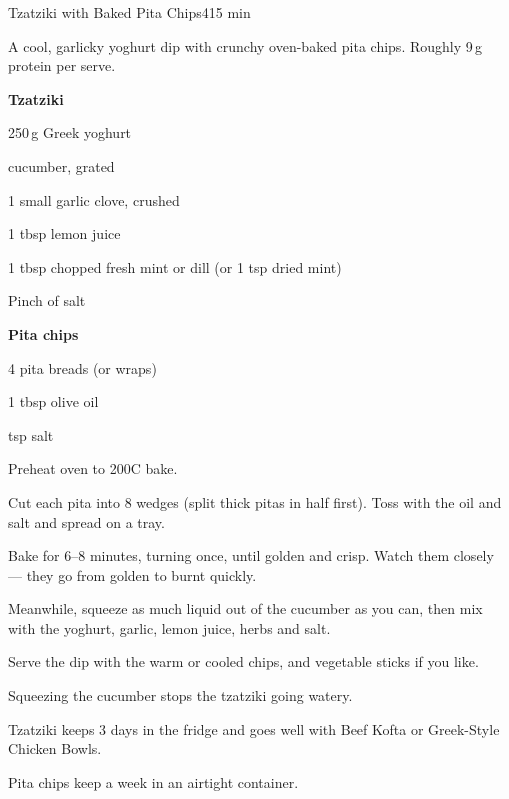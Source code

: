 \begin{recipebox}{Tzatziki with Baked Pita Chips}{4}{15 min}

A cool, garlicky yoghurt dip with crunchy oven-baked pita chips.
Roughly 9\,g protein per serve.

\begin{ingredients}
  \item[] \textbf{Tzatziki}
  \item 250\,g Greek yoghurt
  \item {} cucumber, grated
  \item 1 small garlic clove, crushed
  \item 1 tbsp lemon juice
  \item 1 tbsp chopped fresh mint or dill (or 1 tsp dried mint)
  \item Pinch of salt
  \item[] \textbf{Pita chips}
  \item 4 pita breads (or wraps)
  \item 1 tbsp olive oil
  \item {} tsp salt
\end{ingredients}

\begin{method}
  \item Preheat oven to 200\degree C bake.
  \item Cut each pita into 8 wedges (split thick pitas in half first). Toss with the oil and salt and spread on a tray.
  \item Bake for 6--8 minutes, turning once, until golden and crisp. Watch them closely --- they go from golden to burnt quickly.
  \item Meanwhile, squeeze as much liquid out of the cucumber as you can, then mix with the yoghurt, garlic, lemon juice, herbs and salt.
  \item Serve the dip with the warm or cooled chips, and vegetable sticks if you like.
\end{method}

\begin{notelist}
  \item Squeezing the cucumber stops the tzatziki going watery.
  \item Tzatziki keeps 3 days in the fridge and goes well with Beef Kofta or Greek-Style Chicken Bowls.
  \item Pita chips keep a week in an airtight container.
\end{notelist}

\end{recipebox}
